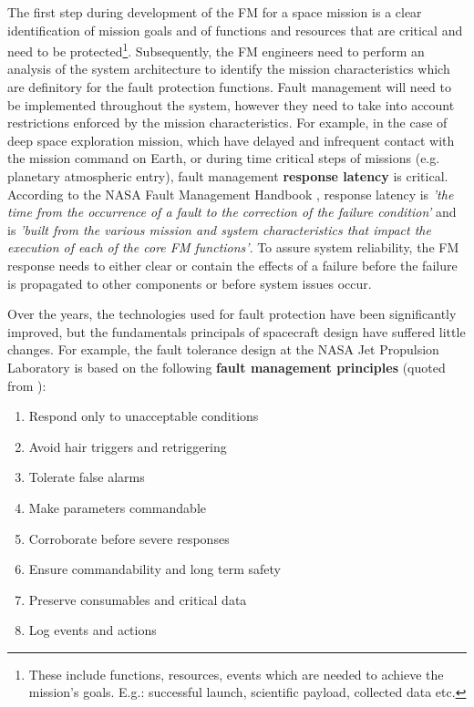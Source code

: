 The first step during development of the FM for a space mission is a clear
identification of mission goals and of functions and resources that are critical
and need to be protected\footnote{These include functions, resources, events
which are needed to achieve the mission's goals. E.g.: successful launch,
scientific payload, collected data etc. }. Subsequently, the FM engineers need
to perform an analysis of the system architecture to identify the mission
characteristics which are definitory for the fault protection functions. Fault
management will need to be implemented throughout the system, however they need
to take into account restrictions enforced by the mission characteristics. For
example, in the case of deep space exploration mission, which have delayed and
infrequent contact with the mission command on Earth, or during time critical
steps of missions (e.g. planetary atmospheric entry), fault management
\textbf{response latency} is critical. According to the NASA Fault Management
Handbook \cite{nasa-fm-handbook}, response latency is \textit{'the time from the
occurrence of a fault to the correction of the failure condition'} and is
\textit{'built from the various mission and system characteristics that impact
the execution of each of the core FM functions'}. To assure system reliability,
the FM response needs to either clear or contain the effects of a failure before
the failure is propagated to other components or before system issues occur.

Over the years, the technologies used for fault protection have been
significantly improved, but the fundamentals principals of spacecraft design
have suffered little changes. For example, the fault tolerance design at the
NASA Jet Propulsion Laboratory is based on the following \textbf{fault
management principles} (quoted from \cite{fm-jpl}):
\begin{enumerate}
  \item Respond only to unacceptable conditions
  \item Avoid hair triggers and retriggering
  \item Tolerate false alarms
  \item Make parameters commandable
  \item Corroborate before severe responses
  \item Ensure commandability and long term safety
  \item Preserve consumables and critical data
  \item Log events and actions
\end{enumerate}

